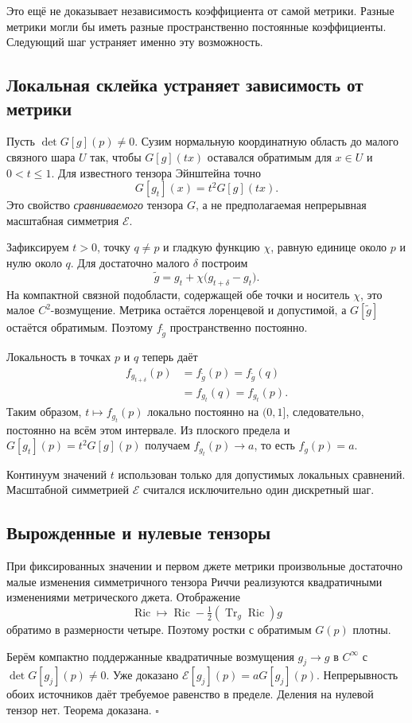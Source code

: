 \documentclass[11pt,a4paper]{article}
\newcommand{\E}{\mathcal E}
\DeclareMathOperator{\Ric}{Ric}
\DeclareMathOperator{\Tr}{Tr}
\begin{document}
Это ещё не доказывает независимость коэффициента от самой метрики. Разные метрики могли бы иметь разные пространственно постоянные коэффициенты. Следующий шаг устраняет именно эту возможность.

\subsection{Локальная склейка устраняет зависимость от метрики}
Пусть $\det G[g](p)\ne0$. Сузим нормальную координатную область до малого связного шара $U$ так, чтобы $G[g](tx)$ оставался обратимым для $x\in U$ и $0<t\le1$. Для известного тензора Эйнштейна точно
\[
G[g_t](x)=t^2G[g](tx).
\]
Это свойство \emph{сравниваемого} тензора $G$, а не предполагаемая непрерывная масштабная симметрия $\E$.

Зафиксируем $t>0$, точку $q\ne p$ и гладкую функцию $\chi$, равную единице около $p$ и нулю около $q$. Для достаточно малого $\delta$ построим
\[
\widetilde g=g_t+\chi\bigl(g_{t+\delta}-g_t\bigr).
\]
На компактной связной подобласти, содержащей обе точки и носитель $\chi$, это малое $C^2$-возмущение. Метрика остаётся лоренцевой и допустимой, а $G[\widetilde g]$ остаётся обратимым. Поэтому $f_{\widetilde g}$ пространственно постоянно.

Локальность в точках $p$ и $q$ теперь даёт
\begin{align*}
f_{g_{t+\delta}}(p)
&=f_{\widetilde g}(p)
 =f_{\widetilde g}(q)\\
&=f_{g_t}(q)=f_{g_t}(p).
\end{align*}
Таким образом, $t\mapsto f_{g_t}(p)$ локально постоянно на $(0,1]$, следовательно, постоянно на всём этом интервале. Из плоского предела и
$G[g_t](p)=t^2G[g](p)$ получаем $f_{g_t}(p)\to a$, то есть $f_g(p)=a$.

Континуум значений $t$ использован только для допустимых локальных сравнений. Масштабной симметрией $\E$ считался исключительно один дискретный шаг.

\subsection{Вырожденные и нулевые тензоры}
При фиксированных значении и первом джете метрики произвольные достаточно малые изменения симметричного тензора Риччи реализуются квадратичными изменениями метрического джета. Отображение
\[
\Ric\longmapsto \Ric-\tfrac12(\Tr_g\Ric)g
\]
обратимо в размерности четыре. Поэтому ростки с обратимым $G(p)$ плотны.

Берём компактно поддержанные квадратичные возмущения $g_j\to g$ в $C^\infty$ с $\det G[g_j](p)\ne0$. Уже доказано $\E[g_j](p)=aG[g_j](p)$. Непрерывность обоих источников даёт требуемое равенство в пределе. Деления на нулевой тензор нет. Теорема доказана. \hfill$\square$
\end{document}
